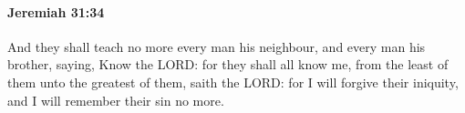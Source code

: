 
		\paragraph{Jeremiah 31:34} %
			\label{JEREMIAH-31-34}

			And they shall teach no more every man his neighbour, and every man his brother, saying, Know the LORD: for they shall all know me, from the least of them unto the greatest of them, saith the LORD: for I will forgive their iniquity, and I will remember their sin no more.


